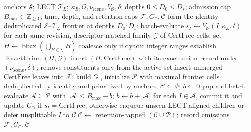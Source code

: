 \documentclass[journal]{IEEEtran}
\newcommand{\calO}{\ensuremath{\mathcal{O}}}
\begin{document}
\begin{algorithm}[!t]
\caption{Zero-gap coalescing and budgeted refinement.}
\label{alg:leaf_sweep_refine}
\footnotesize
\begin{algorithmic}[1]
\REQUIRE anchors $\mathcal{S}$; LECT $\mathcal{T}_L$;
$\kappa_E,\calO,\nu_{\mathrm{scene}},V_{\calO},\delta$;
depths $0\le D_0\le D_s$; admission cap
$B_{\max}\in\mathbb{Z}_{\ge1}$; time, depth, and retention caps
\ENSURE $\mathcal{F},G_\cap,\mathcal{C}$
\STATE form the identity-deduplicated $\mathcal{S}$--$\mathcal{T}_L$ frontier at
depths $D_0{:}D_s$; batch-evaluate
$s_I\leftarrow\widehat V_{\calO}(I;\kappa_E,\delta)$
\STATE for each same-revision, descriptor-matched family $\mathcal{G}$ of
$\mathrm{CertFree}$ cells, set $H\leftarrow\operatorname{bbox}(\bigcup_{B\in\mathcal{G}}B)$
\STATE coalesce only if dyadic integer ranges establish
$\operatorname{ExactUnion}(H,\mathcal{G})$
\STATE insert $(H,\mathrm{CertFree})$ with its exact-union record under
$(\nu_{\mathrm{scene}},\delta)$; remove constituents only from the active set
\STATE insert unmerged $\mathrm{CertFree}$ leaves into $\mathcal{F}$; build $G_\cap$
\STATE initialize $\mathcal{P}$ with maximal frontier cells, deduplicated by
identity and prioritized by anchors; $\mathcal{C}\leftarrow\emptyset$; $b\leftarrow0$
  \STATE pop and batch-evaluate $\mathcal{A}\subseteq\mathcal{P}$ with
  $|\mathcal{A}|\le B_{\max}-b$; $b\leftarrow b+|\mathcal{A}|$
  \STATE for each $I\in\mathcal{A}$, commit it and update $G_\cap$ if
  $s_I=\mathrm{CertFree}$; otherwise
  enqueue unseen LECT-aligned children or defer unsplittable $I$ to $\mathcal{C}$
\ENDWHILE
\STATE $\mathcal{C}\leftarrow$ retention-capped $(\mathcal{C}\cup\mathcal{P})$; record omissions
\RETURN $\mathcal{F},G_\cap,\mathcal{C}$
\end{algorithmic}
\end{algorithm}
\end{document}
